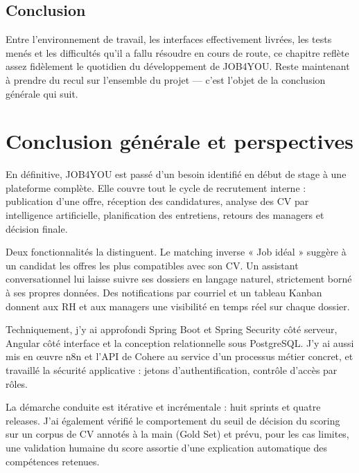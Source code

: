 \documentclass[]{./tpl/isipfe}
\begin{document}
\section{Conclusion}
\label{sec_4_8}
Entre l’environnement de travail, les interfaces effectivement livrées, les tests menés et les difficultés qu’il a fallu résoudre en cours de route, ce chapitre reflète assez fidèlement le quotidien du développement de JOB4YOU. Reste maintenant à prendre du recul sur l’ensemble du projet — c’est l’objet de la conclusion générale qui suit.

        \clearpage
        
\chapter*{Conclusion générale et perspectives}

En définitive, JOB4YOU est passé d’un besoin identifié en début de stage à une plateforme complète. Elle couvre tout le cycle de recrutement interne : publication d’une offre, réception des candidatures, analyse des CV par intelligence artificielle, planification des entretiens, retours des managers et décision finale.

Deux fonctionnalités la distinguent. Le matching inverse « Job idéal » suggère à un candidat les offres les plus compatibles avec son CV. Un assistant conversationnel lui laisse suivre ses dossiers en langage naturel, strictement borné à ses propres données. Des notifications par courriel et un tableau Kanban donnent aux RH et aux managers une visibilité en temps réel sur chaque dossier.

Techniquement, j’y ai approfondi Spring Boot et Spring Security côté serveur, Angular côté interface et la conception relationnelle sous PostgreSQL. J’y ai aussi mis en œuvre n8n et l’API de Cohere au service d’un processus métier concret, et travaillé la sécurité applicative : jetons d’authentification, contrôle d’accès par rôles.

La démarche conduite est itérative et incrémentale : huit sprints et quatre releases. J’ai également vérifié le comportement du seuil de décision du scoring sur un corpus de CV annotés à la main (Gold Set) et prévu, pour les cas limites, une validation humaine du score assortie d’une explication automatique des compétences retenues.
\end{document}
